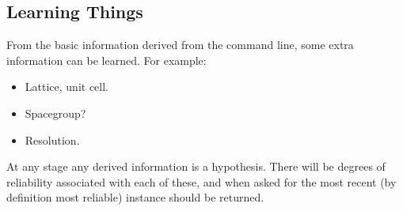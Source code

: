 \documentclass[a4paper, 11pt]{article}
\begin{document}
\subsection{Learning Things}

From the basic information derived from the command line, some extra 
information can be learned. For example:

\begin{itemize}
\item{Lattice, unit cell.}
\item{Spacegroup?}
\item{Resolution.}
\end{itemize}

At any stage any derived information is a hypothesis. There will be degrees
of reliability associated with each of these, and when asked for the most 
recent (by definition most reliable) instance should be returned.
\end{document}
